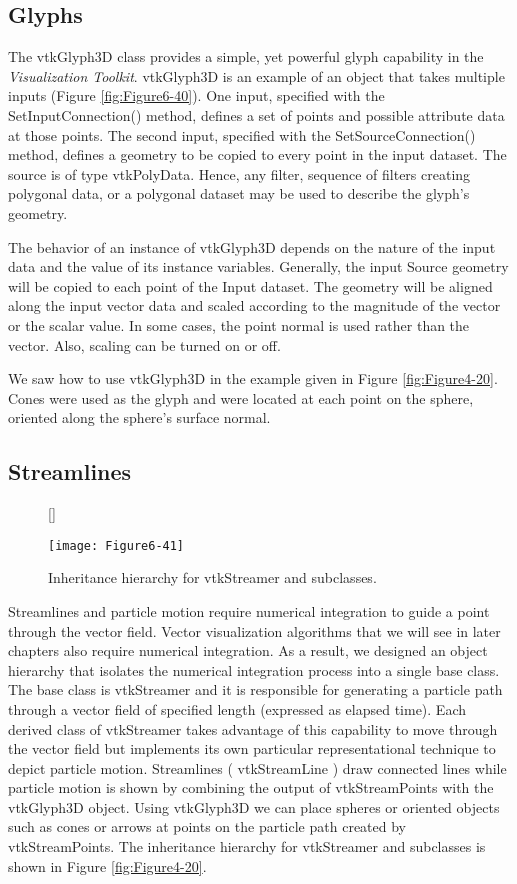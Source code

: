 \subsection{Glyphs}

The vtkGlyph3D class provides a simple, yet powerful glyph capability in the \emph{Visualization Toolkit}. vtkGlyph3D is an example of an object that takes multiple inputs (Figure \ref{fig:Figure6-40}). One input, specified with the SetInputConnection() method, defines a set of points and possible attribute data at those points. The second input, specified with the SetSourceConnection() method, defines a geometry to be copied to every point in the input dataset. The source is of type vtkPolyData. Hence, any filter, sequence of filters creating polygonal data, or a polygonal dataset may be used to describe the glyph's geometry.

The behavior of an instance of vtkGlyph3D depends on the nature of the input data and the value of its instance variables. Generally, the input Source geometry will be copied to each point of the Input dataset. The geometry will be aligned along the input vector data and scaled according to the magnitude of the vector or the scalar value. In some cases, the point normal is used rather than the vector. Also, scaling can be turned on or off.

We saw how to use vtkGlyph3D in the example given in Figure \ref{fig:Figure4-20}. Cones were used as the glyph and were located at each point on the sphere, oriented along the sphere's surface normal.

\subsection{Streamlines}

\begin{figure}[!htb]
	[\FBwidth]
	{\caption{Inheritance hierarchy for vtkStreamer and subclasses.}\label{fig:Figure6-41}}
	{\texttt{[image: Figure6-41]}}
\end{figure}

Streamlines and particle motion require numerical integration to guide a point through the vector field. Vector visualization algorithms that we will see in later chapters also require numerical integration. As a result, we designed an object hierarchy that isolates the numerical integration process into a single base class. The base class is vtkStreamer and it is responsible for generating a particle path through a vector field of specified length (expressed as elapsed time). Each derived class of vtkStreamer takes advantage of this capability to move through the vector field but implements its own particular representational technique to depict particle motion. Streamlines ( vtkStreamLine ) draw connected lines while particle motion is shown by combining the output of vtkStreamPoints with the vtkGlyph3D object. Using vtkGlyph3D we can place spheres or oriented objects such as cones or arrows at points on the particle path created by vtkStreamPoints. The inheritance hierarchy for vtkStreamer and subclasses is shown in  Figure \ref{fig:Figure4-20}.

